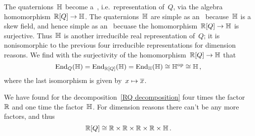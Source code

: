 The quaternions~$\Quaternion$ become a~\module{$\Real[Q]$}, i.e.\ representation of~$Q$, via the algebra homomorphism~$\mathbb{R}[Q] \to \mathbb{H}$.
The quaternions~$\Quaternion$ are simple as an~\module{$\Quaternion$} because~$\Quaternion$ is a skew field, and hence simple as an~\module{$\Real[Q]$} becuase the homomorphism~$\mathbb{R}[Q] \to \mathbb{H}$ is surjective.
Thus~$\Quaternion$ is another irreducible real representation of~$Q$;
it is nonisomorphic to the previous four irreducible representations for dimension reasons.
We find with the surjectivity of the homomorphism~$\mathbb{R}[Q] \to \mathbb{H}$ that
\[
  \operatorname{End}_Q(\mathbb{H})
  =
  \operatorname{End}_{\mathbb{R}[Q]}(\mathbb{H})
  =
  \operatorname{End}_{\mathbb{H}}(\mathbb{H})
  \cong
  \mathbb{H}^{\mathrm{op}}
  \cong
  \mathbb{H} \,,
\]
where the last isomorphism is given by~$x \mapsto \overline{x}$.

We have found for the decomposition~\eqref{RQ decomposition} four times the factor~$\mathbb{R}$ and one time the factor~$\Quaternion$.
For dimension reasons there can’t be any more factors, and thus
\[
  \mathbb{R}[Q]
  \cong
  \mathbb{R} \times \mathbb{R} \times \mathbb{R} \times \mathbb{R} \times \mathbb{H} \,.
\]


